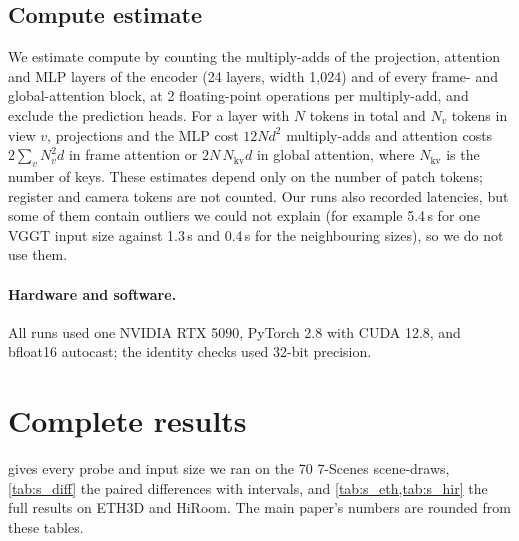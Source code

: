 \documentclass[10pt,twocolumn,letterpaper]{article}
\begin{document}
\subsection{Compute estimate}
\label{sec:s_flops}
We estimate compute by counting the multiply-adds of the projection, attention and MLP layers of the encoder (24 layers, width 1{,}024) and of every frame- and global-attention block, at 2 floating-point operations per multiply-add, and exclude the prediction heads. For a layer with $N$ tokens in total and $N_v$ tokens in view $v$, projections and the MLP cost $12Nd^2$ multiply-adds and attention costs $2\sum_v N_v^2 d$ in frame attention or $2N\,N_{\mathrm{kv}}d$ in global attention, where $N_{\mathrm{kv}}$ is the number of keys. These estimates depend only on the number of patch tokens; register and camera tokens are not counted. Our runs also recorded latencies, but some of them contain outliers we could not explain (for example 5.4\,s for one VGGT input size against 1.3\,s and 0.4\,s for the neighbouring sizes), so we do not use them.

\paragraph{Hardware and software.} All runs used one NVIDIA RTX 5090, PyTorch 2.8 with CUDA 12.8, and bfloat16 autocast; the identity checks used 32-bit precision.

\section{Complete results}
\label{sec:s_full}

 gives every probe and input size we ran on the 70 7-Scenes scene-draws, \cref{tab:s_diff} the paired differences with intervals, and \cref{tab:s_eth,tab:s_hir} the full results on ETH3D and HiRoom. The main paper's numbers are rounded from these tables.
\end{document}
